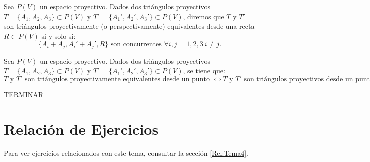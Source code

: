 \begin{definicion}
    Sea $P(V)$ un espacio proyectivo.
    Dados dos triángulos proyectivos $T = \{A_1, A_2, A_3\}\subset P(V)$ y $T' = \{A_1', A_2', A_3'\}\subset P(V)$,
    diremos que $T$ y $T'$ son triángulos proyectivamente (o perspectivamente) equivalentes desde una recta $R \subset P(V)$ si y solo si:
    \begin{equation*}
        \{A_i + A_j, A_i' + A_j', R\} \text{ son concurrentes } \forall i,j=1,2,3~i\neq j.
    \end{equation*}
\end{definicion}



\begin{teo}
    Sea $P(V)$ un espacio proyectivo.
    Dados dos triángulos proyectivos $T = \{A_1, A_2, A_3\}\subset P(V)$ y $T' = \{A_1', A_2', A_3'\}\subset P(V)$,
    se tiene que:
    \begin{equation*}
        T \text{ y } T' \text{ son triángulos proyectivamente equivalentes desde un punto } \Leftrightarrow T \text{ y } T' \text{ son triángulos proyectivos desde
        un punto } \Leftrightarrow T \text{ y } T' \text{ son triángulos proyectivamente equivalentes desde una recta } \Leftrightarrow T \text{ y } T' \text{ son triángulos proyectivos desde una recta}.
    \end{equation*}
\end{teo}
TERMINAR %




\section{Relación de Ejercicios}

Para ver ejercicios relacionados con este tema, consultar la sección \ref{Rel:Tema4}.